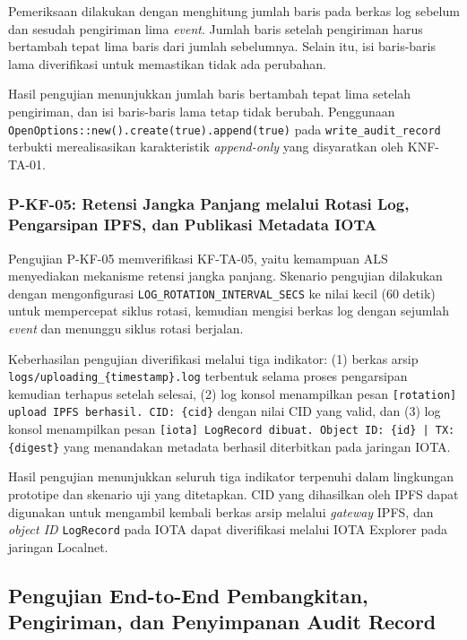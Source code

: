 Pemeriksaan dilakukan dengan menghitung jumlah baris pada berkas log sebelum dan sesudah pengiriman lima \textit{event}. Jumlah baris setelah pengiriman harus bertambah tepat lima baris dari jumlah sebelumnya. Selain itu, isi baris-baris lama diverifikasi untuk memastikan tidak ada perubahan.

Hasil pengujian menunjukkan jumlah baris bertambah tepat lima setelah pengiriman, dan isi baris-baris lama tetap tidak berubah. Penggunaan \texttt{OpenOptions::new().create(true).append(true)} pada \texttt{write\_audit\_record} terbukti merealisasikan karakteristik \textit{append-only} yang disyaratkan oleh KNF-TA-01.

\subsubsection{P-KF-05: Retensi Jangka Panjang melalui Rotasi Log, Pengarsipan IPFS, dan Publikasi Metadata IOTA}

Pengujian P-KF-05 memverifikasi KF-TA-05, yaitu kemampuan ALS menyediakan mekanisme retensi jangka panjang. Skenario pengujian dilakukan dengan mengonfigurasi \texttt{LOG\_ROTATION\_INTERVAL\_SECS} ke nilai kecil (60 detik) untuk mempercepat siklus rotasi, kemudian mengisi berkas log dengan sejumlah \textit{event} dan menunggu siklus rotasi berjalan.

Keberhasilan pengujian diverifikasi melalui tiga indikator: (1) berkas arsip \texttt{logs/uploading\_\{timestamp\}.log} terbentuk selama proses pengarsipan kemudian terhapus setelah selesai, (2) log konsol menampilkan pesan \texttt{[rotation] upload IPFS berhasil. CID: \{cid\}} dengan nilai CID yang valid, dan (3) log konsol menampilkan pesan \texttt{[iota] LogRecord dibuat. Object ID: \{id\} | TX: \{digest\}} yang menandakan metadata berhasil diterbitkan pada jaringan IOTA.

Hasil pengujian menunjukkan seluruh tiga indikator terpenuhi dalam lingkungan prototipe dan skenario uji yang ditetapkan. CID yang dihasilkan oleh IPFS dapat digunakan untuk mengambil kembali berkas arsip melalui \textit{gateway} IPFS, dan \textit{object ID} \texttt{LogRecord} pada IOTA dapat diverifikasi melalui IOTA Explorer pada jaringan Localnet.

\subsection{Pengujian End-to-End Pembangkitan, Pengiriman, dan Penyimpanan Audit
Record}
\label{subsec:pengujian-siklus-lengkap}
 
